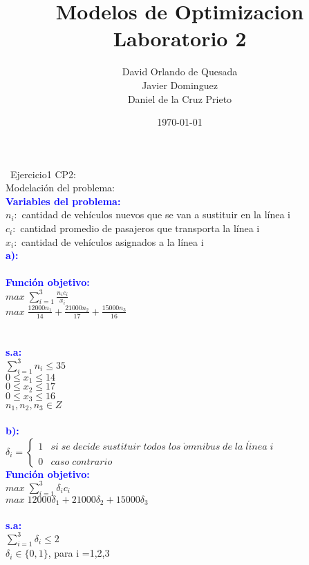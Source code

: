 \documentclass[]{article}
\begin{document}
\title{\bf  Modelos de Optimizacion Laboratorio 2}          
\author{David Orlando de Quesada \\ Javier Dominguez \\ Daniel de la Cruz Prieto   }                        
\date{\today} 

\maketitle 
\noindent\ Ejercicio1 CP2:\\

\noindent Modelaci\'on del problema:\\

\noindent \textcolor{blue}{\textbf{Variables del problema:}}\\
\noindent
$n_{i}:$ cantidad de veh\'iculos nuevos que se van a sustituir en la l\'inea i\\
$c_{i}:$ cantidad promedio de pasajeros que transporta la l\'inea i\\
$x_{i}:$ cantidad de veh\'iculos asignados a la l\'inea i\\
\noindent \textcolor{blue}{\textbf{a):}}\\\\
\noindent \textcolor{blue}{\textbf{Funci\'on objetivo:}}\\ 
$max\;  \sum_{i=1}^{3}\frac{n_{i}c_{i}}{x_{i}}$
\\
$max\;  \frac{12000n_{1}}{14} + \frac{21000n_{2}}{17} + \frac{15000n_{3}}{16}$\\
\\\\
\noindent \textcolor{blue}{\textbf{s.a:}}\\
$\sum_{i=1}^{3}n_{i} \le 35$\\
$ 0\le x_{1} \le 14$\\
$ 0\le x_{2} \le 17$\\
$ 0\le x_{3} \le 16$\\
$n_{1},n_{2},n_{3} \in Z$\\\\
\noindent \textcolor{blue}{\textbf{b):}}\\

\noindent
$   
    \textbf{$\delta_{i}$}=
    \left\lbrace\begin{array}{cc}
        1 & si\; se\; decide\; sustituir\; todos\; los\; \acute{o}mnibus\; de\; la\; l\acute{i}nea\; i\\\\
        0 & caso\; contrario
    \end{array}\right.
$
\\
\noindent \textcolor{blue}{\textbf{Funci\'on objetivo:}}\\
$max\;  \sum_{i=1}^{3}\delta_{i}c_{i}$\\
$max\;  12000\delta_{1} + 21000\delta_{2} + 15000 \delta_{3}$\\\\
\noindent \textcolor{blue}{\textbf{s.a:}}\\
$\sum_{i=1}^{3}\delta_{i}\le 2$\\
$\delta_{i}\in \{0,1\}$, para i =1,2,3\\
\\\\
\end{document}
